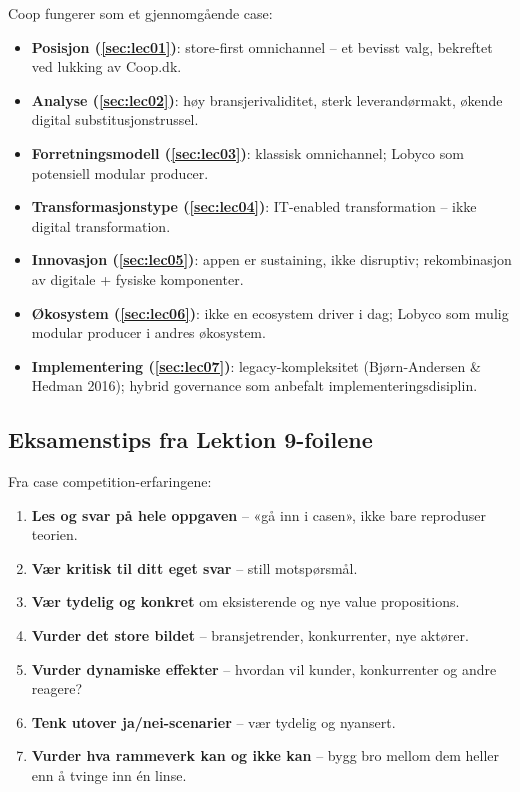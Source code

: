 Coop fungerer som et gjennomgående case:
\begin{itemize}
  \item \textbf{Posisjon (\autoref{sec:lec01})}: store-first omnichannel --
    et bevisst valg, bekreftet ved lukking av Coop.dk.
  \item \textbf{Analyse (\autoref{sec:lec02})}: høy bransjerivaliditet,
    sterk leverandørmakt, økende digital substitusjonstrussel.
  \item \textbf{Forretningsmodell (\autoref{sec:lec03})}: klassisk
    omnichannel; Lobyco som potensiell modular producer.
  \item \textbf{Transformasjonstype (\autoref{sec:lec04})}: IT-enabled
    transformation -- ikke digital transformation.
  \item \textbf{Innovasjon (\autoref{sec:lec05})}: appen er sustaining,
    ikke disruptiv; rekombinasjon av digitale + fysiske komponenter.
  \item \textbf{Økosystem (\autoref{sec:lec06})}: ikke en ecosystem driver
    i dag; Lobyco som mulig modular producer i andres økosystem.
  \item \textbf{Implementering (\autoref{sec:lec07})}: legacy-kompleksitet
    (Bjørn-Andersen \& Hedman 2016); hybrid governance som anbefalt
    implementeringsdisiplin.
\end{itemize}

\subsection{Eksamenstips fra Lektion 9-foilene}
Fra case competition-erfaringene:
\begin{enumerate}
  \item \textbf{Les og svar på hele oppgaven} -- «gå inn i casen», ikke
    bare reproduser teorien.
  \item \textbf{Vær kritisk til ditt eget svar} -- still motspørsmål.
  \item \textbf{Vær tydelig og konkret} om eksisterende og nye value
    propositions.
  \item \textbf{Vurder det store bildet} -- bransjetrender, konkurrenter,
    nye aktører.
  \item \textbf{Vurder dynamiske effekter} -- hvordan vil kunder,
    konkurrenter og andre reagere?
  \item \textbf{Tenk utover ja/nei-scenarier} -- vær tydelig og nyansert.
  \item \textbf{Vurder hva rammeverk kan og ikke kan} -- bygg bro mellom
    dem heller enn å tvinge inn én linse.
\end{enumerate}


